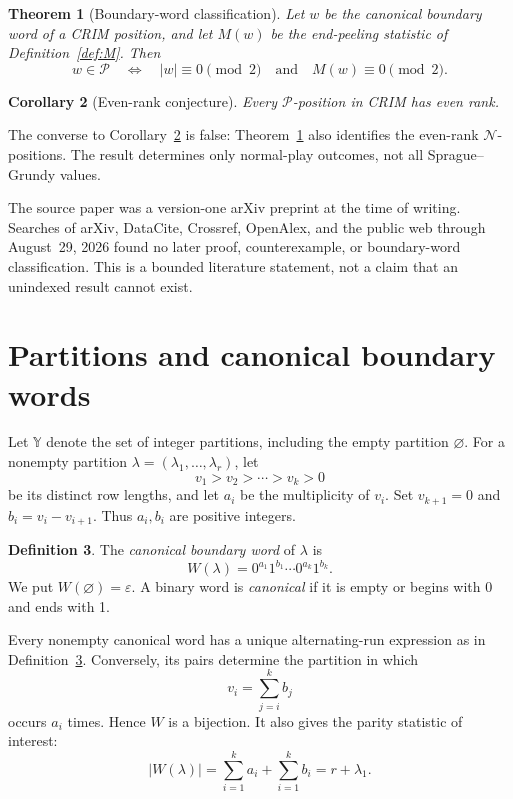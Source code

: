 \documentclass[11pt]{amsart}
\newtheorem{theorem}{Theorem}[section]
\newtheorem{corollary}[theorem]{Corollary}
\theoremstyle{definition}
\newtheorem{definition}[theorem]{Definition}
\newcommand{\cP}{\mathcal P}
\newcommand{\cN}{\mathcal N}
\newcommand{\eps}{\varepsilon}
\begin{document}
\begin{theorem}[Boundary-word classification]\label{thm:classification}
Let $w$ be the canonical boundary word of a CRIM position, and let $M(w)$ be
the end-peeling statistic of Definition~\ref{def:M}.  Then
\[
 w\in\cP
 \quad\Longleftrightarrow\quad
 |w|\equiv0\pmod 2
 \quad\text{and}\quad
 M(w)\equiv0\pmod 2.
\]
\end{theorem}

\begin{corollary}[Even-rank conjecture]\label{cor:rank}
Every $\cP$-position in CRIM has even rank.
\end{corollary}

The converse to Corollary~\ref{cor:rank} is false: Theorem~\ref{thm:classification}
also identifies the even-rank $\cN$-positions.  The result determines only
normal-play outcomes, not all Sprague--Grundy values.

The source paper was a version-one arXiv preprint at the time of writing.
Searches of arXiv, DataCite, Crossref, OpenAlex, and the public web through
August~29, 2026 found no later proof, counterexample, or boundary-word
classification.  This is a bounded literature statement, not a claim that an
unindexed result cannot exist.

\section{Partitions and canonical boundary words}\label{sec:words}

Let $\mathbb Y$ denote the set of integer partitions, including the empty
partition $\varnothing$.  For a nonempty partition
$\lambda=(\lambda_1,\ldots,\lambda_r)$, let
\[
 v_1>v_2>\cdots>v_k>0
\]
be its distinct row lengths, and let $a_i$ be the multiplicity of $v_i$.
Set $v_{k+1}=0$ and $b_i=v_i-v_{i+1}$.  Thus $a_i,b_i$ are positive integers.

\begin{definition}\label{def:word}
The \emph{canonical boundary word} of $\lambda$ is
\[
 W(\lambda)=0^{a_1}1^{b_1}\cdots0^{a_k}1^{b_k}.
\]
We put $W(\varnothing)=\eps$.  A binary word is \emph{canonical} if it is
empty or begins with 0 and ends with 1.
\end{definition}

Every nonempty canonical word has a unique alternating-run expression as in
Definition~\ref{def:word}.  Conversely, its pairs determine the partition in
which
\[
 v_i=\sum_{j=i}^k b_j
\]
occurs $a_i$ times.  Hence $W$ is a bijection.  It also gives the parity
statistic of interest:
\begin{equation}\label{eq:length}
 |W(\lambda)|=\sum_{i=1}^k a_i+\sum_{i=1}^k b_i
 =r+\lambda_1.
\end{equation}
\end{document}
